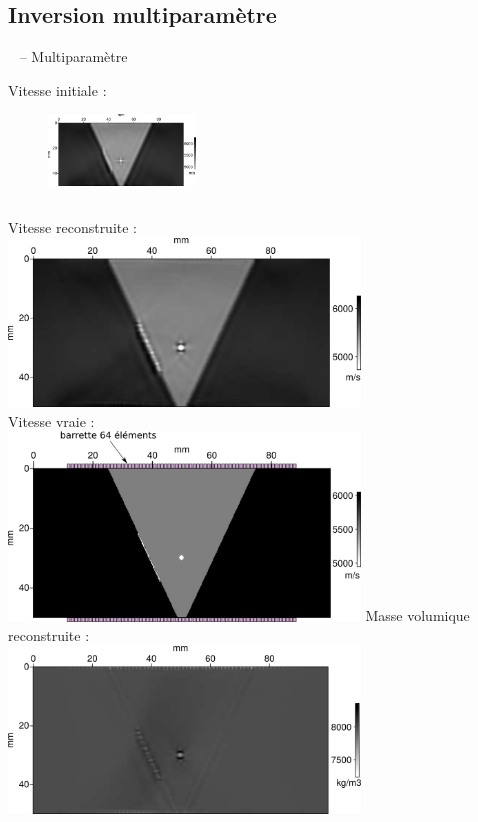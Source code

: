 \documentclass[10pt,xcolor=x11names,compress, notes=show]{beamer}%
\begin{document}
\subsection{Inversion multiparamètre}
\begin{frame}{\insertsectionhead~ -- Multiparamètre}
\begin{small}
	\centering
	Vitesse initiale :
	\begin{figure}
		\centering
		\includegraphics[width=0.35\textwidth]{img/vp_mono_smooth/vp_smooth.png}\\
	\end{figure}
	
	\begin{columns}
		\centering
		Vitesse reconstruite :\\[0.2cm]
		\includegraphics[width=0.7\textwidth]{img/multi/vp_multi_6000k.png}	\\
		
		Vitesse vraie : \\[0.2cm]
		\includegraphics[width=0.7\textwidth]{img/vp_true.png}
		\centering
		Masse volumique reconstruite :\\[0.2cm]
		\includegraphics[width=0.7\textwidth]{img/multi/rho_6000k.png}\\	
		

\end{columns}
\end{small}
\end{frame}
\end{document}
